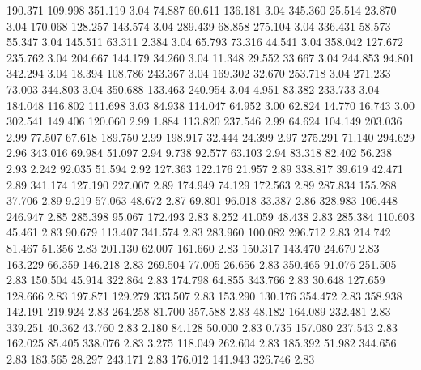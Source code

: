  190.371  109.998  351.119         3.04
  74.887   60.611  136.181         3.04
 345.360   25.514   23.870         3.04
 170.068  128.257  143.574         3.04
 289.439   68.858  275.104         3.04
 336.431   58.573   55.347         3.04
 145.511   63.311    2.384         3.04
  65.793   73.316   44.541         3.04
 358.042  127.672  235.762         3.04
 204.667  144.179   34.260         3.04
  11.348   29.552   33.667         3.04
 244.853   94.801  342.294         3.04
  18.394  108.786  243.367         3.04
 169.302   32.670  253.718         3.04
 271.233   73.003  344.803         3.04
 350.688  133.463  240.954         3.04
   4.951   83.382  233.733         3.04
 184.048  116.802  111.698         3.03
  84.938  114.047   64.952         3.00
  62.824   14.770   16.743         3.00
 302.541  149.406  120.060         2.99
   1.884  113.820  237.546         2.99
  64.624  104.149  203.036         2.99
  77.507   67.618  189.750         2.99
 198.917   32.444   24.399         2.97
 275.291   71.140  294.629         2.96
 343.016   69.984   51.097         2.94
   9.738   92.577   63.103         2.94
  83.318   82.402   56.238         2.93
   2.242   92.035   51.594         2.92
 127.363  122.176   21.957         2.89
 338.817   39.619   42.471         2.89
 341.174  127.190  227.007         2.89
 174.949   74.129  172.563         2.89
 287.834  155.288   37.706         2.89
   9.219   57.063   48.672         2.87
  69.801   96.018   33.387         2.86
 328.983  106.448  246.947         2.85
 285.398   95.067  172.493         2.83
   8.252   41.059   48.438         2.83
 285.384  110.603   45.461         2.83
  90.679  113.407  341.574         2.83
 283.960  100.082  296.712         2.83
 214.742   81.467   51.356         2.83
 201.130   62.007  161.660         2.83
 150.317  143.470   24.670         2.83
 163.229   66.359  146.218         2.83
 269.504   77.005   26.656         2.83
 350.465   91.076  251.505         2.83
 150.504   45.914  322.864         2.83
 174.798   64.855  343.766         2.83
  30.648  127.659  128.666         2.83
 197.871  129.279  333.507         2.83
 153.290  130.176  354.472         2.83
 358.938  142.191  219.924         2.83
 264.258   81.700  357.588         2.83
  48.182  164.089  232.481         2.83
 339.251   40.362   43.760         2.83
   2.180   84.128   50.000         2.83
   0.735  157.080  237.543         2.83
 162.025   85.405  338.076         2.83
   3.275  118.049  262.604         2.83
 185.392   51.982  344.656         2.83
 183.565   28.297  243.171         2.83
 176.012  141.943  326.746         2.83
